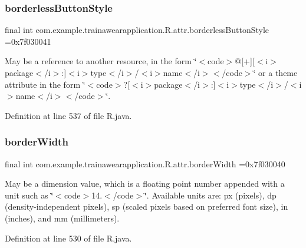 \subsubsection{\texorpdfstring{borderlessButtonStyle}{borderlessButtonStyle}}
{\footnotesize\ttfamily final int com.\+example.\+trainawearapplication.\+R.\+attr.\+borderless\+Button\+Style =0x7f030041\hspace{0.3cm}{\ttfamily [static]}}

May be a reference to another resource, in the form \char`\"{}$<$code$>$@\mbox{[}+\mbox{]}\mbox{[}$<$i$>$package$<$/i$>$\+:\mbox{]}$<$i$>$type$<$/i$>$/$<$i$>$name$<$/i$>$$<$/code$>$\char`\"{} or a theme attribute in the form \char`\"{}$<$code$>$?\mbox{[}$<$i$>$package$<$/i$>$\+:\mbox{]}$<$i$>$type$<$/i$>$/$<$i$>$name$<$/i$>$$<$/code$>$\char`\"{}. 

Definition at line 537 of file R.\+java.

\mbox{\label{classcom_1_1example_1_1trainawearapplication_1_1_r_1_1attr_a78ec18f0adc154f9a3171fda31fc404d}} 
\subsubsection{\texorpdfstring{borderWidth}{borderWidth}}
{\footnotesize\ttfamily final int com.\+example.\+trainawearapplication.\+R.\+attr.\+border\+Width =0x7f030040\hspace{0.3cm}{\ttfamily [static]}}

May be a dimension value, which is a floating point number appended with a unit such as \char`\"{}$<$code$>$14.\+5sp$<$/code$>$\char`\"{}. Available units are\+: px (pixels), dp (density-\/independent pixels), sp (scaled pixels based on preferred font size), in (inches), and mm (millimeters). 

Definition at line 530 of file R.\+java.

\mbox{\label{classcom_1_1example_1_1trainawearapplication_1_1_r_1_1attr_aa00aff2f92ba986c849c82621df3e2c9}} 
